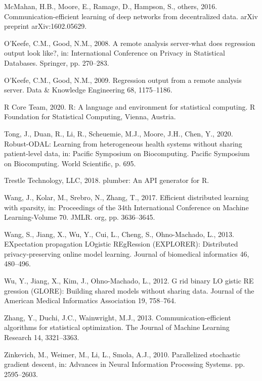\documentclass[]{elsarticle} %
\newlength{\cslhangindent}
\newenvironment{cslreferences}%
  {\setlength{\parindent}{0pt}%
  \everypar{\setlength{\hangindent}{\cslhangindent}}\ignorespaces}%
  {\par}
\begin{document}
\begin{cslreferences}
\leavevmode\hypertarget{ref-mcmahan2016communication}{}%
McMahan, H.B., Moore, E., Ramage, D., Hampson, S., others, 2016.
Communication-efficient learning of deep networks from decentralized
data. arXiv preprint arXiv:1602.05629.

\leavevmode\hypertarget{ref-o2008remote}{}%
O'Keefe, C.M., Good, N.M., 2008. A remote analysis server-what does
regression output look like?, in: International Conference on Privacy in
Statistical Databases. Springer, pp. 270--283.

\leavevmode\hypertarget{ref-o2009regression}{}%
O'Keefe, C.M., Good, N.M., 2009. Regression output from a remote
analysis server. Data \& Knowledge Engineering 68, 1175--1186.

\leavevmode\hypertarget{ref-RCORE}{}%
R Core Team, 2020. R: A language and environment for statistical
computing. R Foundation for Statistical Computing, Vienna, Austria.

\leavevmode\hypertarget{ref-tong2020robust}{}%
Tong, J., Duan, R., Li, R., Scheuemie, M.J., Moore, J.H., Chen, Y.,
2020. Robust-ODAL: Learning from heterogeneous health systems without
sharing patient-level data, in: Pacific Symposium on Biocomputing.
Pacific Symposium on Biocomputing. World Scientific, p. 695.

\leavevmode\hypertarget{ref-plumber}{}%
Trestle Technology, LLC, 2018. plumber: An API generator for R.

\leavevmode\hypertarget{ref-wang2017efficient}{}%
Wang, J., Kolar, M., Srebro, N., Zhang, T., 2017. Efficient distributed
learning with sparsity, in: Proceedings of the 34th International
Conference on Machine Learning-Volume 70. JMLR. org, pp. 3636--3645.

\leavevmode\hypertarget{ref-explorer}{}%
Wang, S., Jiang, X., Wu, Y., Cui, L., Cheng, S., Ohno-Machado, L., 2013.
EXpectation propagation LOgistic REgRession (EXPLORER): Distributed
privacy-preserving online model learning. Journal of biomedical
informatics 46, 480--496.

\leavevmode\hypertarget{ref-glore}{}%
Wu, Y., Jiang, X., Kim, J., Ohno-Machado, L., 2012. G rid binary LO
gistic RE gression (GLORE): Building shared models without sharing data.
Journal of the American Medical Informatics Association 19, 758--764.

\leavevmode\hypertarget{ref-zhang2013communication}{}%
Zhang, Y., Duchi, J.C., Wainwright, M.J., 2013. Communication-efficient
algorithms for statistical optimization. The Journal of Machine Learning
Research 14, 3321--3363.

\leavevmode\hypertarget{ref-zinkevich2010parallelized}{}%
Zinkevich, M., Weimer, M., Li, L., Smola, A.J., 2010. Parallelized
stochastic gradient descent, in: Advances in Neural Information
Processing Systems. pp. 2595--2603.
\end{cslreferences}
\end{document}
